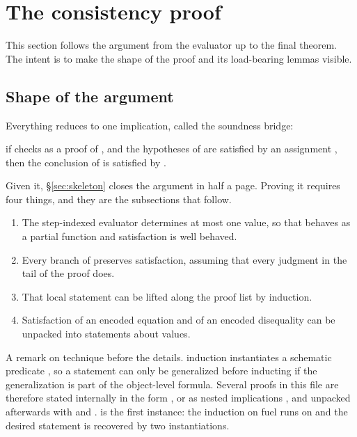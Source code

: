 \section{The consistency proof}
\label{sec:proof}

This section follows the argument from the evaluator up to the final theorem.
The intent is to make the shape of the proof and its load-bearing lemmas
visible.

\subsection{Shape of the argument}

Everything reduces to one implication, called the soundness bridge:

\begin{center}
if  checks as a proof of , and the hypotheses of  are
satisfied by an assignment , then the conclusion of  is satisfied
by .
\end{center}

\noindent
Given it, \S\ref{sec:skeleton} closes the argument in half a page.  Proving it
requires four things, and they are the subsections that follow.

\begin{enumerate}
\item The step-indexed evaluator determines at most one value, so that
       behaves as a partial function and satisfaction is well
      behaved.
\item Every branch of  preserves satisfaction, assuming that
      every judgment in the tail of the proof does.
\item That local statement can be lifted along the proof list by induction.
\item Satisfaction of an encoded equation and of an encoded disequality can be
      unpacked into statements about values.
\end{enumerate}

\noindent
A remark on technique before the details.  \QGA{} induction instantiates a
schematic predicate , so a statement can only be generalized before
inducting if the generalization is part of the object-level formula.  Several
proofs in this file are therefore stated internally in the form
, or as nested implications , and unpacked
afterwards with  and .   is the first
instance: the induction on fuel runs on  and
the desired statement is recovered by two instantiations.

